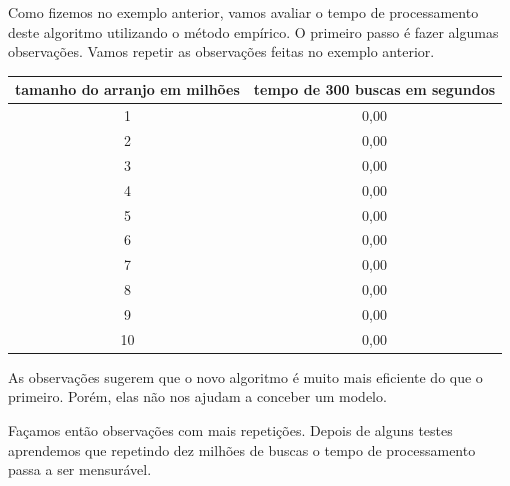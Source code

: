 Como fizemos no exemplo anterior, vamos avaliar o tempo de processamento deste algoritmo utilizando o método empírico.
O primeiro passo é fazer algumas observações.
Vamos repetir as observações feitas no exemplo anterior.

\begin{table}
  \label{tab:observacao2}
  \begin{tabular}{|c|c|}
    \hline
    tamanho do arranjo em milhões & tempo de 300 buscas em segundos \\
    \hline 
    1                             & 0,00                            \\
    2                             & 0,00                            \\
    3                             & 0,00                            \\
    4                             & 0,00                            \\
    5                             & 0,00                            \\
    6                             & 0,00                            \\
    7                             & 0,00                            \\
    8                             & 0,00                            \\
    9                             & 0,00                            \\
    10                            & 0,00                            \\
    \hline
  \end{tabular}
\end{table}

As observações sugerem que o novo algoritmo é muito mais eficiente do que o primeiro.
Porém, elas não nos ajudam a conceber um modelo.

Façamos então observações com mais repetições.
Depois de alguns testes aprendemos que repetindo dez milhões de buscas o tempo de processamento passa a ser mensurável.


